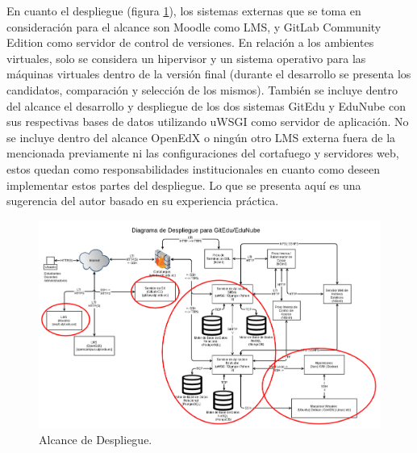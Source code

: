 En cuanto el despliegue (figura \ref{alc_desp_ge_en}), los sistemas externas que se toma en consideración para el alcance son Moodle como LMS, y GitLab Community Edition como servidor de control de versiones. En relación a los ambientes virtuales, solo se considera un hipervisor y un sistema operativo para las máquinas virtuales dentro de la versión final (durante el desarrollo se presenta los candidatos, comparación y selección de los mismos). También se incluye dentro del alcance el desarrollo y despliegue de los dos sistemas GitEdu y EduNube con sus respectivas bases de datos utilizando uWSGI como servidor de aplicación. No se incluye dentro del alcance OpenEdX o ningún otro LMS  externa fuera de la mencionada previamente ni las configuraciones del cortafuego y servidores web, estos quedan como responsabilidades institucionales en cuanto como deseen implementar estos partes del despliegue. Lo que se presenta aquí es una sugerencia del autor basado en su experiencia práctica.

\begin{landscape}

	\begin{figure}
	  \begin{center}
	    \includegraphics[width=1.4\textwidth]{Figures/alc_desp_ge_en.png}
	  \end{center}
	  \caption{Alcance de Despliegue.}
	  \label{alc_desp_ge_en}
	\end{figure}

\end{landscape}
